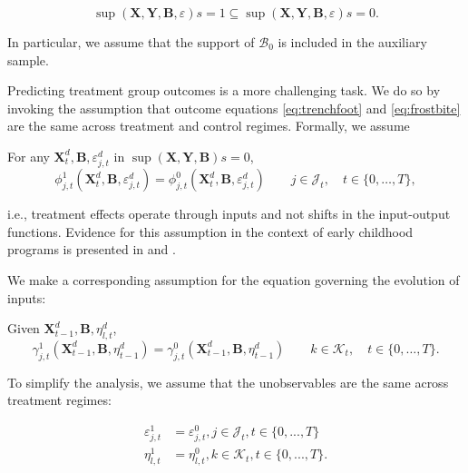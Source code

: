 \begin{assumption} \label{ass:contain}
\begin{equation*}
\sup(\bm{X}, \bm{Y}, \bm{B}, \varepsilon) s=1 \subseteq \sup (\bm{X}, \bm{Y}, \bm{B}, \varepsilon) s=0.
\end{equation*}
\end{assumption}
In particular, we assume that the support of $\mathcal{B}_0$ is included in the auxiliary sample.

Predicting treatment group outcomes is a more challenging task. We do so by invoking the assumption that outcome equations \eqref{eq:trenchfoot} and \eqref{eq:frostbite} are the same across treatment and control regimes. Formally, we assume

\renewcommand\theassumption{A--\arabic{assumption}(a)}
\begin{assumption}\label{ass:eczema}
For any $\bm{X}^d_t, \bm{B}, \varepsilon^d_{j,t}$ in $\sup(\bm{X},\bm{Y},\bm{B}) s=0$,
\begin{equation*}
\phi^1_{j,t} (\bm{X}^d_t, \bm{B}, \varepsilon^d_{j,t}) = \phi^0_{j,t} (\bm{X}^d_t, \bm{B}, \varepsilon^d_{j,t}) \qquad j \in \mathcal J_t, \quad t \in \{0,\dots,T\},
\end{equation*}
\end{assumption}
i.e., treatment effects operate through inputs and not shifts in the input-output functions. Evidence for this assumption in the context of early childhood programs is presented in \citet{Heckman_Pinto_etal_2013_PerryFactor} and \citet{Attanasio-etal_2015_NBER_Estimating-Production}.

We make a corresponding assumption for the equation governing the evolution of inputs:
\addtocounter{assumption}{-1}
\renewcommand\theassumption{A--\arabic{assumption}(b)}
\begin{assumption}\label{ass:psoriasis}
Given $\bm{X}^d_{t-1}, \bm{B}, \eta^d_{l,t}$,
\begin{equation*}
\gamma^1_{j,t} (\bm{X}^d_{t-1}, \bm{B}, \eta^d_{t-1}) = \gamma^0_{j,t} (\bm{X}^d_{t-1}, \bm{B}, \eta^d_{t-1}) \qquad k \in \mathcal{K}_t, \quad t \in \{0,\dots,T\}.
\end{equation*}
\end{assumption}
To simplify the analysis, we assume that the unobservables are the same across treatment regimes:

\renewcommand\theassumption{A--\arabic{assumption}}
\begin{assumption}\label{ass:fox}
\begin{align*}
\varepsilon^{1}_{j,t} &= \varepsilon^{0}_{j,t} , j \in \mathcal{J}_t, t \in \{ 0,..., T\} \\
\eta^{1}_{l,t} &= \eta^{0}_{l,t} , k \in \mathcal{K}_t, t \in \{0,...,T\}.
\end{align*}
\end{assumption}

